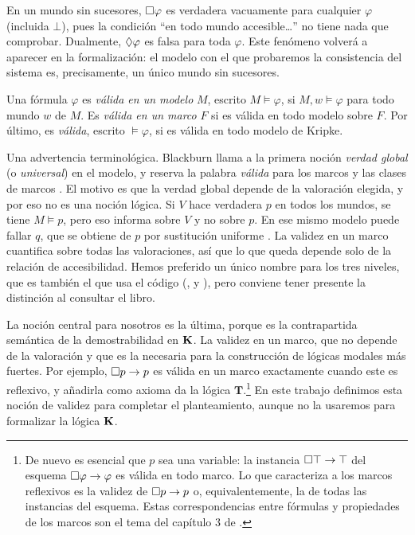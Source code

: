 \begin{observacion}
En un mundo sin sucesores, $\square\varphi$ es verdadera vacuamente para cualquier $\varphi$ (incluida $\bot$), pues la condición ``en todo mundo accesible\dots'' no tiene nada que comprobar. Dualmente, $\lozenge\varphi$ es falsa para toda $\varphi$. Este fenómeno volverá a aparecer en la formalización: el modelo con el que probaremos la consistencia del sistema es, precisamente, un único mundo sin sucesores.
\end{observacion}

\begin{definicion}[Validez]\label{def:validez}
Una fórmula $\varphi$ es \emph{válida en un modelo} $M$, escrito $M \vDash \varphi$, si $M, w \vDash \varphi$ para todo mundo $w$ de $M$. Es \emph{válida en un marco} $F$ si es válida en todo modelo sobre $F$. Por último, es \emph{válida}, escrito $\vDash \varphi$, si es válida en todo modelo de Kripke.
\end{definicion}

\begin{observacion}
Una advertencia terminológica. Blackburn \cite[Def.~1.21]{blackburn} llama a la primera noción \emph{verdad global} (o \emph{universal}) en el modelo, y reserva la palabra \emph{válida} para los marcos y las clases de marcos \cite[Def.~1.28]{blackburn}. El motivo es que la verdad global depende de la valoración elegida, y por eso no es una noción lógica. Si $V$ hace verdadera $p$ en todos los mundos, se tiene $M \vDash p$, pero eso informa sobre $V$ y no sobre $p$. En ese mismo modelo puede fallar $q$, que se obtiene de $p$ por sustitución uniforme \cite[p.~34]{blackburn}. La validez en un marco cuantifica sobre todas las valoraciones, así que lo que queda depende solo de la relación de accesibilidad. Hemos preferido un único nombre para los tres niveles, que es también el que usa el código (,  y ), pero conviene tener presente la distinción al consultar el libro.
\end{observacion}

La noción central para nosotros es la última, porque es la contrapartida semántica de la demostrabilidad en $\mathbf{K}$. La validez en un marco, que no depende de la valoración y que es la necesaria para la construcción de lógicas modales más fuertes. Por ejemplo, $\square p \to p$ es válida en un marco exactamente cuando este es reflexivo, y añadirla como axioma da la lógica $\mathbf{T}$.\footnote{De nuevo es esencial que $p$ sea una variable: la instancia $\square\top \to \top$ del esquema $\square\varphi \to \varphi$ es válida en todo marco. Lo que caracteriza a los marcos reflexivos es la validez de $\square p \to p$ o, equivalentemente, la de todas las instancias del esquema. Estas correspondencias entre fórmulas y propiedades de los marcos son el tema del capítulo 3 de \cite{blackburn}.} En este trabajo definimos esta noción de validez para completar el planteamiento, aunque no la usaremos para formalizar la lógica $\mathbf{K}$.

